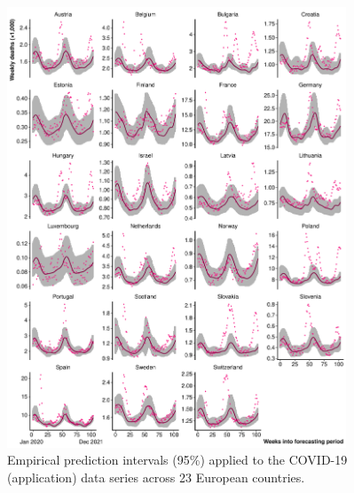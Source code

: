 \documentclass[12pt]{article}
\begin{document}
\begin{figure}[ht!]
    \centering
    \includegraphics[width=0.9\textwidth]{fig/22-applicationbycountry.pdf}
     \caption{Empirical prediction intervals (95\%) applied to the COVID-19 (application) data series across 23 European countries.}
     \label{fig:PIs_application_series_appendix}
\end{figure}


\clearpage




\clearpage
\end{document}
